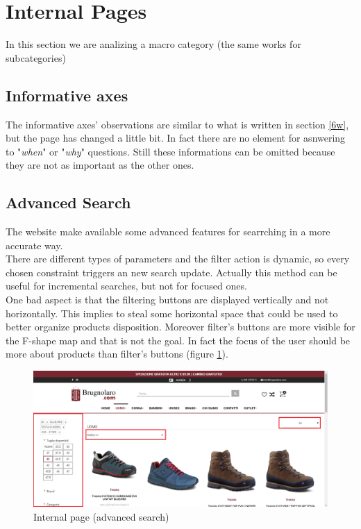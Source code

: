 \section{Internal Pages}
In this section we are analizing a macro category (the same works for subcategories)

\subsection{Informative axes}
The informative axes' observations are similar to what is written in section \ref{6w},
but the page has changed a little bit. In fact there are no element for asnwering to
"\textit{when}" or "\textit{why}" questions. Still these informations can be omitted
because they are not as important as the other ones.

\subsection{Advanced Search}
The website make available some advanced features for searrching in a more accurate way.\\
There are different types of parameters and the filter action is dynamic, so every chosen
constraint triggers an new search update. Actually this method can be useful for incremental searches,
but not for focused ones.\\
One bad aspect is that the filtering buttons are displayed vertically and not horizontally.
This implies to steal some horizontal space that could be used  to better organize products disposition.
Moreover filter's buttons are more visible for the F-shape map and that is not the goal. In fact the focus of the user should be more
about products than filter's buttons (figure \ref{internal-adv-search}).

\begin{figure}[!h] 
    \centering 
    \includegraphics[scale = 0.29]{images/adv_search.png} 
    \caption{Internal page (advanced search)}
    \label{internal-adv-search}
\end{figure}
\newpage
